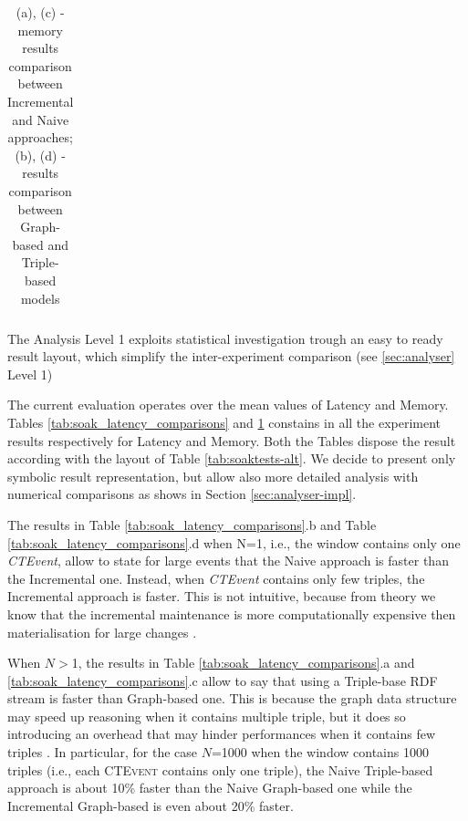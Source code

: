 \begin{table}[htbp]
{\begin{tabular}{l | ccccc}
		\hline %
	 	\end{tabular}
	}
	\caption{(a), (c) - memory results comparison between Incremental and Naive approaches; (b), (d) - results comparison between Graph-based and Triple-based models}
	\label{tab:soak_memory_comparisons}	
\end{table}

The Analysis Level 1 exploits statistical investigation trough an easy to ready result layout, which simplify the inter-experiment comparison (see \ref{sec:analyser} Level 1)

The current evaluation operates over the mean values of Latency and Memory. Tables \ref{tab:soak_latency_comparisons} and \ref{tab:soak_memory_comparisons} constains in all the experiment results respectively for Latency and Memory.  Both the Tables dispose the result according with the layout of Table \ref{tab:soaktests-alt}. We decide to present only symbolic result representation, but \name allow also more detailed analysis with numerical comparisons as shows in Section \ref{sec:analyser-impl}.

The results in Table \ref{tab:soak_latency_comparisons}.b and Table \ref{tab:soak_latency_comparisons}.d when N=1, i.e., the window contains only one \textit{CTEvent}, allow to state for large events that the Naive approach is faster than the Incremental one. Instead, when \textit{CTEvent} contains only few triples, the Incremental approach is faster. This is not intuitive, because from theory we know that the incremental maintenance is more computationally expensive then materialisation for large changes \cite{DellAglio2014,DBLP:conf/cikm/RenP11,DBLP:conf/semweb/UrbaniMJHB13}.

When $N>$1, the results in Table \ref{tab:soak_latency_comparisons}.a and \ref{tab:soak_latency_comparisons}.c allow to say that using a Triple-base RDF stream is faster than Graph-based one. This is because the graph data structure may speed up reasoning when it contains multiple triple, but it does so introducing an overhead that may hinder performances when it contains few triples \cite{DBLP:conf/semweb/BalduiniVDTPC13}. In particular, for the case $N$=1000 when the window contains 1000 triples (i.e., each \textsc{CTEvent} contains only one triple),  the Naive Triple-based approach is about 10\% faster  than the Naive Graph-based one while the Incremental Graph-based is even about 20\% faster.

